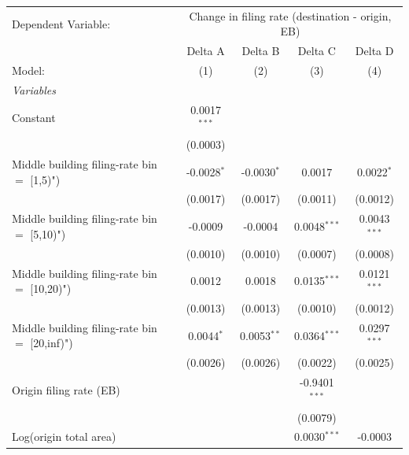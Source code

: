 \begingroup
\centering
\begin{tabular}{lcccc}
   \tabularnewline \midrule \midrule
   Dependent Variable: & \multicolumn{4}{c}{Change in filing rate (destination - origin, EB)}\\
                                                  & Delta A        & Delta B       & Delta C         & Delta D \\   
   Model:                                         & (1)            & (2)           & (3)             & (4)\\  
   \midrule
   \emph{Variables}\\
   Constant                                       & 0.0017$^{***}$ &               &                 &   \\   
                                                  & (0.0003)       &               &                 &   \\   
   Middle building filing-rate bin $=$ [1,5)")    & -0.0028$^{*}$  & -0.0030$^{*}$ & 0.0017          & 0.0022$^{*}$\\   
                                                  & (0.0017)       & (0.0017)      & (0.0011)        & (0.0012)\\   
   Middle building filing-rate bin $=$ [5,10)")   & -0.0009        & -0.0004       & 0.0048$^{***}$  & 0.0043$^{***}$\\   
                                                  & (0.0010)       & (0.0010)      & (0.0007)        & (0.0008)\\   
   Middle building filing-rate bin $=$ [10,20)")  & 0.0012         & 0.0018        & 0.0135$^{***}$  & 0.0121$^{***}$\\   
                                                  & (0.0013)       & (0.0013)      & (0.0010)        & (0.0012)\\   
   Middle building filing-rate bin $=$ [20,inf)") & 0.0044$^{*}$   & 0.0053$^{**}$ & 0.0364$^{***}$  & 0.0297$^{***}$\\   
                                                  & (0.0026)       & (0.0026)      & (0.0022)        & (0.0025)\\   
   Origin filing rate (EB)                        &                &               & -0.9401$^{***}$ &   \\   
                                                  &                &               & (0.0079)        &   \\   
   Log(origin total area)                         &                &               & 0.0030$^{***}$  & -0.0003\\   

\end{tabular}
